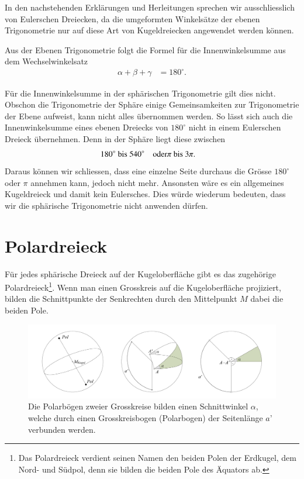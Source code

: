 \begin{refsection}
In den nachstehenden Erklärungen und Herleitungen sprechen wir
ausschliesslich von Eulerschen Dreiecken, da die umgeformten
Winkelsätze der ebenen Trigonometrie nur auf diese Art von
Kugeldreiecken angewendet werden können.

Aus der Ebenen Trigonometrie folgt die Formel für die Innenwinkelsumme
aus dem Wechselwinkelsatz
\begin{align*}
\alpha + \beta + \gamma &= 180^{\circ}.
\end{align*}

Für die Innenwinkelsumme in der sphärischen Trigonometrie gilt dies
nicht. Obschon die Trigonometrie der Sphäre einige Gemeinsamkeiten
zur Trigonometrie der Ebene aufweist, kann nicht alles übernommen
werden.
So lässt sich auch die Innenwinkelsumme eines ebenen Dreiecks von
$180^{\circ}$ nicht in einem Eulerschen Dreieck übernehmen.
Denn in der Sphäre liegt diese zwischen
\[
\begin{aligned}
\text{$180^{\circ}$ bis $540^{\circ}$}
&
&\text{oder}
&
\text{$ \pi$  bis $ 3\pi$}.
\end{aligned}
\]
Daraus können wir schliessen, dass eine einzelne Seite durchaus die
Grösse $180^{\circ}$ oder $\pi$ annehmen kann, jedoch nicht mehr.
Ansonsten wäre es ein allgemeines Kugeldreieck und damit kein
Eulersches. Dies würde wiederum bedeuten, dass wir die sphärische
Trigonometrie nicht anwenden dürfen.


\section{Polardreieck}
%
Für jedes sphärische Dreieck auf der Kugeloberfläche gibt es das
zugehörige Polardreieck\footnote{%
Das Polardreieck verdient seinen Namen den beiden Polen der Erdkugel,
dem Nord- und Südpol, denn sie bilden die beiden Pole des Äquators
ab.}. Wenn man einen Grosskreis auf die Kugeloberfläche projiziert,
bilden die Schnittpunkte der Senkrechten durch den Mittelpunkt $M$
dabei die beiden Pole.

\begin{figure}
\centering
\includegraphics[width=1\textwidth]{kugel/Polar.jpg}
\caption{Die Polarbögen zweier Grosskreise bilden einen Schnittwinkel
$\alpha$, welche durch einen Grosskreisbogen (Polarbogen) der
Seitenlänge $a’$ verbunden werden.}
\label{V8}
\end{figure}


\end{refsection}
